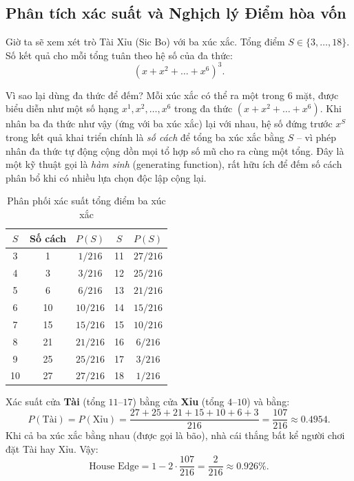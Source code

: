 \documentclass[12pt,a4paper]{article}
\theoremstyle{coloredthm}
\theoremstyle{coloreddef}
\theoremstyle{remark}
\begin{document}
\subsection{Phân tích xác suất và Nghịch lý Điểm hòa vốn}

Giờ ta sẽ xem xét trò Tài Xỉu (Sic Bo) với ba xúc xắc. Tổng điểm $S \in \{3,\dots,18\}$. Số kết quả cho mỗi tổng tuân theo hệ số của đa thức:
\[
(x+x^2+\dots+x^6)^3.
\]

\begin{giaithich}
Vì sao lại dùng đa thức để đếm? Mỗi xúc xắc có thể ra một trong $6$ mặt, được biểu diễn như một số hạng $x^1, x^2, \dots, x^6$ trong đa thức $(x+x^2+\dots+x^6)$. Khi nhân ba đa thức như vậy (ứng với ba xúc xắc) lại với nhau, hệ số đứng trước $x^S$ trong kết quả khai triển chính là \emph{số cách} để tổng ba xúc xắc bằng $S$ -- vì phép nhân đa thức tự động cộng dồn mọi tổ hợp số mũ cho ra cùng một tổng. Đây là một kỹ thuật gọi là \emph{hàm sinh} (generating function), rất hữu ích để đếm số cách phân bổ khi có nhiều lựa chọn độc lập cộng lại.
\end{giaithich}

\begin{table}[H]
\centering
\caption{Phân phối xác suất tổng điểm ba xúc xắc}
\begin{tabular}{c c c c c}
\toprule
$S$ & Số cách & $P(S)$ & $S$ & $P(S)$ \\
\midrule
3  & 1   & $1/216$ & 11 & $27/216$ \\
4  & 3   & $3/216$ & 12 & $25/216$ \\
5  & 6   & $6/216$ & 13 & $21/216$ \\
6  & 10  & $10/216$& 14 & $15/216$ \\
7  & 15  & $15/216$& 15 & $10/216$ \\
8  & 21  & $21/216$& 16 & $6/216$ \\
9  & 25  & $25/216$& 17 & $3/216$ \\
10 & 27  & $27/216$& 18 & $1/216$ \\
\bottomrule
\end{tabular}
\end{table}

Xác suất cửa \textbf{Tài} (tổng $11$--$17$) bằng cửa \textbf{Xỉu} (tổng $4$--$10$) và bằng:
\[
P(\text{Tài}) = P(\text{Xỉu}) = \frac{27+25+21+15+10+6+3}{216} = \frac{107}{216} \approx 0.4954.
\]
Khi cả ba xúc xắc bằng nhau (được gọi là bão), nhà cái thắng bất kể người chơi đặt Tài hay Xỉu. Vậy:
\[
\text{House Edge} = 1 - 2\cdot \frac{107}{216} = \frac{2}{216} \approx 0.926\%.
\]
\end{document}

